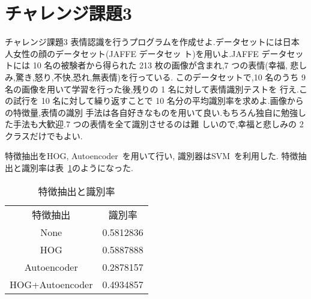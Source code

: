 \section{チャレンジ課題3}\label{section:challenge3}
\begin{itembox}{チャレンジ課題3}
  表情認識を行うプログラムを作成せよ.データセットには日本人女性の顔のデータセット(JAFFE データセッ ト)を用いよ.JAFFE データセットには 10 名の被験者から得られた 213 枚の画像が含まれ,7 つの表情(幸福, 悲しみ,驚き,怒り,不快,恐れ,無表情)を行っている.
  このデータセットで,10 名のうち 9 名の画像を用いて学習を行った後,残りの 1 名に対して表情識別テストを 行え.この試行を 10 名に対して繰り返すことで 10 名分の平均識別率を求めよ.画像からの特徴量,表情の識別 手法は各自好きなものを用いて良い.もちろん独自に勉強した手法も大歓迎.7 つの表情を全て識別させるのは難 しいので,幸福と悲しみの 2 クラスだけでもよい.
\end{itembox}

特徴抽出をHOG, Autoencoder~\cite{autoencoder}を用いて行い,
識別器はSVM~\cite{sklearn-svm}を利用した.
特徴抽出と識別率は表~\ref{tbl:feature-extraction-score}のようになった.

\begin{table}[htbp]
  \begin{center}
    \begin{tabular}{cc}
      特徴抽出 & 識別率 \\
      None & 0.5812836 \\
      HOG & 0.5887888  \\
      Autoencoder & 0.2878157 \\
      HOG+Autoencoder & 0.4934857  \\
    \end{tabular}
    \caption{特徴抽出と識別率}
    \label{tbl:feature-extraction-score}
  \end{center}
\end{table}
